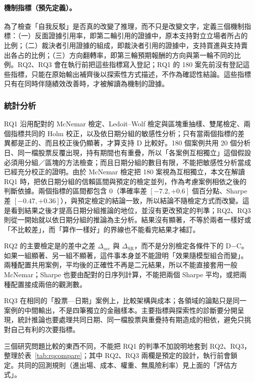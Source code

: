 \paragraph{機制指標（預先定義）。} 為了檢查「自我反駁」是否真的改變了推理，而不只是改變文字，定義三個機制指標：（一）反面證據引用率，即第二輪引用的證據中，原本支持對立立場者所占的比例；（二）裁決者引用證據的組成，即裁決者引用的證據中，支持買進與支持賣出各占的比例；（三）方向翻轉率，即第三輪預期報酬的方向與第一輪不同的比例。RQ2、RQ3 會在執行前把這些指標寫入登記；RQ1 的 180 案先前沒有登記這些指標，只能在原始輸出補齊後以探索性方式描述，不作為確認性結論。這些指標只有在同時伴隨績效改善時，才被解讀為機制的證據。

\subsubsection{統計分析}

RQ1 沿用配對的 McNemar 檢定、Ledoit--Wolf 檢定與區塊重抽樣、雙尾檢定、兩個指標共同的 Holm 校正，以及依日期分組的敏感性分析；只有當兩個指標的差異都是正的、而且校正後仍顯著，才算支持 D 比較好。180 個案例共用 20 個分析日、同一檔股票反覆出現，持有期間也有重疊，所以「各案例互相獨立」這個假設必須用分組／區塊的方法檢查；而且日期分組的數目有限，不能把敏感性分析當成已經充分校正的證明。由於 McNemar 檢定把 180 案視為互相獨立，本文在解讀 RQ1 時，把依日期分組的信賴區間與預定的檢定並列，作為考慮案例相依之後的判斷依據。兩個指標的區間都包含 0（準確率差 $[-7.2,+0.6]$ 個百分點、Sharpe 差 $[-0.47,+0.36]$），與預定檢定的結論一致，所以結論不隨檢定方式而改變。這是看到結果之後才提高日期分組推論的地位，並沒有更改預定的判準；RQ2、RQ3 則從一開始就以依日期分組的推論為主分析。結果沒有顯著，不等於兩者一樣好或「不比較差」，而「算作一樣好」的界線也不能看完結果才補訂。

RQ2 的主要檢定是的差中之差 $\Delta_{\mathrm{acc}}$ 與 $\Delta_{\mathrm{SR}}$，而不是分別檢定各條件下的 D$-$C。如果一組顯著、另一組不顯著，這件事本身並不能證明「效果隨模型組合而變」。兩種配置共用案例，平均後的正確性不再是二元結果，所以不能直接套用一般 McNemar；Sharpe 也要由配對的日序列計算，不能把兩個 Sharpe 平均，或把兩種配置接成兩倍的觀測數。

RQ3 在相同的「股票—日期」案例上，比較架構與成本；各領域的論點只是同一案例的中間輸出，不是四筆獨立的金融樣本。主要指標與探索性的診斷要分開呈現，統計推論也要處理共同日期、同一檔股票與重疊持有期造成的相依，避免只挑對自己有利的次要指標。

三個研究問題比較的東西不同，不能把 RQ1 的判準不加說明地套到 RQ2、RQ3，整理於表~\ref{tab:rqcompare}；其中 RQ2、RQ3 兩欄是預定的設計，執行前會鎖定。共同的回測規則（進出場、成本、權重、無風險利率）見上面的「評估方式」。

